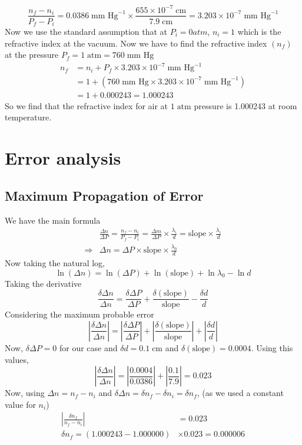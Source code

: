 \[
\frac{n_f - n_i}{P_f - P_i} = 0.0386 \; \text{mm Hg}^{-1}\times \frac{655 \times 10^{-7} \; \text{cm}}{7.9 \; \text{cm}} = 3.203 \times 10 ^{-7} \; \text{mm Hg}^{-1}
\]
Now we use the standard assumption that at $P_i = 0 atm$, $n_i = 1$ which is the refractive index at the vacuum. Now we have to find the refractive index $(n_f)$ at the pressure $P_f = 1 \; \text{atm} = 760 \; \text{mm Hg}$
\begin{align*}
    n_f &= n_i + P_f \times 3.203 \times 10 ^{-7} \; \text{mm Hg}^{-1} \\
    &= 1 + (760 \; \text{mm Hg} \times 3.203 \times 10 ^{-7} \; \text{mm Hg}^{-1}) \\
    & = 1 + 0.000243 = 1.000243
\end{align*}
So we find that the refractive index for air at $1 \; \text{atm}$ pressure is 1.000243 at room temperature.
\section{Error analysis}
\subsection{Maximum Propagation of Error}
We have the main formula 
\begin{align*}
    &\frac{\Delta n}{\Delta P} = \frac{n_f - n_i}{P_f - P_i} = \frac{\Delta m}{\Delta P} \times \frac{\lambda_i}{d} = \text{slope} \times \frac{\lambda_i}{d} \\
    \Rightarrow & \Delta n = \Delta P \times \text{slope} \times \frac{\lambda_0}{d}
\end{align*}
Now taking the natural log,
\[
\ln (\Delta n) = \ln (\Delta P) + \ln (\text{slope}) + \ln \lambda_0 - \ln d
\]
Taking the derivative
\[
\frac{\delta \Delta n}{\Delta n} = \frac{\delta \Delta P}{\Delta P} + \frac{\delta (\text{slope})}{\text{slope}} - \frac{\delta d}{d}
\]
Considering the maximum probable error
\[
\left|\frac{\delta \Delta n}{\Delta n}\right| = \left|\frac{\delta \Delta P}{\Delta P}\right| + \left|\frac{\delta (\text{slope})}{\text{slope}}\right| + \left|\frac{\delta d}{d}\right|
\]
Now, $\delta \Delta P = 0$ for our case and $\delta d = 0.1 \; \text{cm}$ and $\delta (\text{slope}) = 0.0004$. Using this values,
\[
\left|\frac{\delta \Delta n}{\Delta n}\right| = \left|\frac{0.0004}{0.0386}\right| + \left|\frac{0.1}{7.9}\right| = 0.023
\]
Now, using $\Delta n = n_f - n_i$ and $\delta \Delta n = \delta n_f - \delta n_i = \delta n_f$, (as we used a constant value for $n_i$)
\begin{align*}
    \left|\frac{\delta n_f}{n_f - n_i}\right| &= 0.023 \\
    \delta n_f = (1.000243 - 1.000000) &  \times 0.023 = 0.000006
\end{align*}

